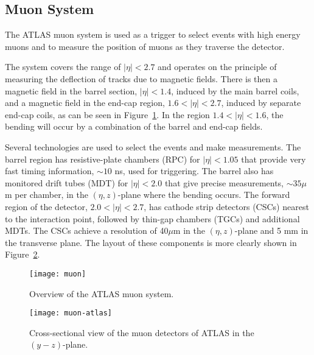 \subsection{Muon System}

The ATLAS muon system is used as a trigger to select events with high energy muons and to measure the position of muons
as they traverse the detector.


The system covers the range of $|\eta| < 2.7$ and operates on the principle of measuring the deflection of tracks due to magnetic fields.
There is then a magnetic field in the barrel section, $|\eta| < 1.4$, induced by the main barrel coils, 
and a magnetic field in the end-cap region, $1.6 < |\eta| < 2.7$, induced by separate end-cap coils, as can be 
seen in Figure~\ref{fig:exp.atlas.muon.all}.
In the region $1.4 < |\eta| < 1.6$, the bending will occur by a combination of the barrel and end-cap fields.

Several technologies are used to select the events and make measurements.
The barrel region has resistive-plate chambers (RPC) for $|\eta| < 1.05$  that provide very fast timing information, $\sim 10$ ns,
used for triggering. The barrel also has monitored drift tubes (MDT) for $|\eta| < 2.0$ that give precise measurements, $\sim 35 \mu$m per chamber,
in the $\left(\eta,z\right)$-plane where the bending occurs.
The forward region of the detector, $2.0 < |\eta| < 2.7$,  has cathode strip detectors (CSCs)  nearest to the interaction point,
followed by thin-gap chambers (TGCs) and additional MDTs. The CSCs achieve a resolution of 40$\mu$m in the $\left(\eta,z\right)$-plane
and 5 mm in the transverse plane.
The layout of these components is more clearly shown in Figure~\ref{fig:exp.atlas.muon}.


\begin{figure}[htb!]
\centering
\texttt{[image: muon]}
\caption{Overview of the ATLAS muon system.}%
\label{fig:exp.atlas.muon.all}
\end{figure} 


\begin{figure}[htb!]
\centering
\texttt{[image: muon-atlas]}
\caption{Cross-sectional view of the muon detectors of ATLAS in the $\left(y-z\right)$-plane.}%
\label{fig:exp.atlas.muon}
\end{figure} 
